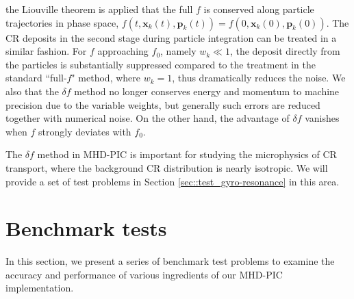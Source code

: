 \documentclass[fleqn,usenatbib]{mnras}
\begin{document}
the Liouville theorem is applied that the full $f$ is conserved
along 
particle trajectories
in phase space, $f\left(t, \boldsymbol{x}_k\left(t\right), \boldsymbol{p}_k\left(t\right)\right)=f\left(0, \boldsymbol{x}_k\left(0\right), \boldsymbol{p}_k\left(0\right)\right)$. 
The CR deposits in the
second stage during particle integration can be treated in a similar fashion. 
For $f$ approaching $f_0$,
namely $w_k \ll 1$, the deposit
directly from the particles is substantially suppressed compared to the treatment in the standard ``full-$f$" method, where $w_k=1$, thus dramatically reduces the noise. We also that the $\delta f$ method no longer conserves energy and momentum to machine precision due to the variable weights, but generally such errors are reduced together with numerical noise. On the other hand, the advantage of $\delta f$ vanishes when $f$ strongly deviates with $f_0$.

The $\delta f$ method in MHD-PIC is important for studying the microphysics of CR transport, where the background CR distribution is nearly isotropic. We will provide a set of test problems in Section \ref{sec::test_gyro-resonance} in this area.

\section{Benchmark tests}
In this section, we present a series of benchmark test problems to examine the accuracy and performance of various ingredients of our MHD-PIC implementation.
\end{document}
